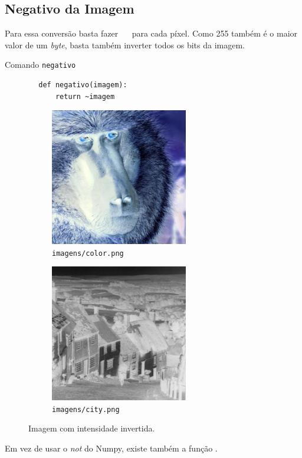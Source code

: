 \subsection{Negativo da Imagem}

Para essa conversão basta fazer ~~ para cada píxel. Como 255 também é o maior valor de um \textit{byte}, basta também inverter todos os bits da imagem.

\begin{listing}[h]
    \caption{Comando \texttt{negativo}}

    \begin{verbatim}
        def negativo(imagem):
            return ~imagem
    \end{verbatim}
\end{listing}

\begin{figure}[h]
    \centering
    \begin{subfigure}{0.45\textwidth}
        \centering
        \includegraphics[width=6cm]{resultados/colorneg.png}
        \caption{\texttt{imagens/color.png}}
    \end{subfigure}%
    \begin{subfigure}{0.45\textwidth}
        \centering
        \includegraphics[width=6cm]{resultados/cityneg.png}
        \caption{\texttt{imagens/city.png}}
    \end{subfigure}

    \caption{Imagem com intensidade invertida.}
\end{figure}

Em vez de usar o \textit{not} do Numpy, existe também a função  \autocite{ref:bitwise_not}.
